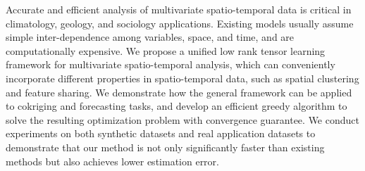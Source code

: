Accurate and efficient analysis of multivariate spatio-temporal data is critical in climatology, geology, and sociology applications. Existing models usually assume simple inter-dependence among variables, space, and time, and are computationally expensive. We propose a unified low rank tensor learning framework for multivariate spatio-temporal analysis, which can conveniently incorporate different properties in spatio-temporal data, such as spatial clustering and feature sharing.   We demonstrate how the general framework can be applied to cokriging and forecasting tasks, and develop an efficient greedy algorithm to solve the resulting optimization problem with convergence guarantee. We conduct experiments on both synthetic datasets and real application datasets to demonstrate that our method is not only significantly faster than existing methods but also achieves lower estimation error. 
